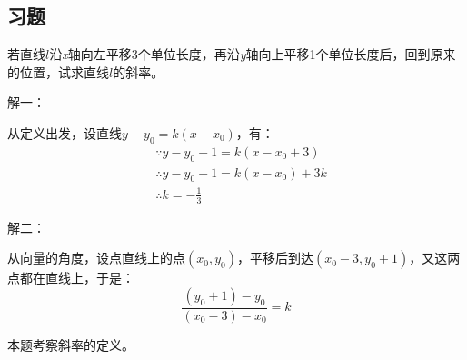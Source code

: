\subsection{习题}

\begin{example}
若直线$l$沿{\it x}轴向左平移3个单位长度，再沿{\it y}轴向上平移1个单位长度后，回到原来的位置，试求直线$l$的斜率。
\end{example}

解一：

从定义出发，设直线$y-y_0=k\left( x-x_0 \right) $，有：
\begin{align*}
&\because y-y_0-1=k\left( x-x_0+3 \right) \\
&\therefore y-y_0-1=k\left( x-x_0 \right) +3k \\
&\therefore k=-\frac{1}{3}
\end{align*}

解二：

从向量的角度，设点直线上的点$\left( x_0,y_0 \right) $，平移后到达$\left( x_0-3,y_0+1 \right) $，又这两点都在直线上，于是：
\[
\frac{\left( y_0+1 \right) -y_0}{\left( x_0-3 \right) -x_0}=k
\]

\begin{tcolorbox}
本题考察斜率的定义。
\end{tcolorbox}




